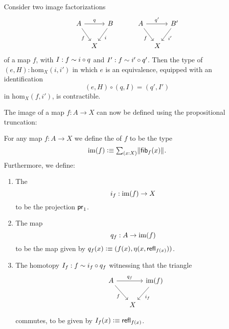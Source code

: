 \begin{cor}\label{cor:uniqueness-image}
  Consider two image factorizations
  \begin{equation*}
    \begin{tikzcd}[column sep=tiny]
      A \arrow[dr,swap,"f"] \arrow[rr,"q"] & & B \arrow[dl,"i"] &[2em] A \arrow[dr,swap,"f"] \arrow[rr,"{q'}"] & & B' \arrow[dl,"{i'}"] \\
      & X & & \phantom{B'} & X
    \end{tikzcd}
  \end{equation*}
  of a map $f$, with $I:f\sim i\circ q$ and $I':f\sim i'\circ q'$. Then the type of $(e,H):\mathrm{hom}_X(i,i')$ in which $e$ is an equivalence, equipped with an identification
  \begin{equation*}
    (e,H)\circ(q,I)=(q',I')
  \end{equation*}
  in $\mathrm{hom}_X(f,i')$, is contractible.
\end{cor}

The image of a map $f:A\to X$ can now be defined using the propositional truncation:

\begin{defn}
For any map $f:A\to X$ we define the  of $f$ to be the type
\begin{equation*}
\im(f) \defeq \sm{x:X}\brck{\fib{f}{x}}.
\end{equation*}
Furthermore, we define:
\begin{enumerate}
\item The 
  \begin{equation*}
    i_f:\operatorname{im}(f)\to X
  \end{equation*}
  to be the projection $\mathsf{pr}_{1}$.
\item The map
  \begin{equation*}
    q_f:A\to\operatorname{im}(f)
  \end{equation*}
  to be the map given by $q_f(x)\vcentcolon\equiv(f(x),\eta(x,\mathsf{refl}_{f(x)}))$.
\item The homotopy $I_f:f\sim i_f\circ q_f$ witnessing that the triangle
  \begin{equation*}
    \begin{tikzcd}[column sep=tiny]
      A \arrow[rr,"q_f"] \arrow[dr,swap,"f"] & & \im(f) \arrow[dl,"i_f"] \\
      \phantom{\im(f)} & X
    \end{tikzcd}
  \end{equation*}
  commutes, to be given by $I_f(x)\vcentcolon\equiv\mathsf{refl}_{f(x)}$.
\end{enumerate}
\end{defn}

